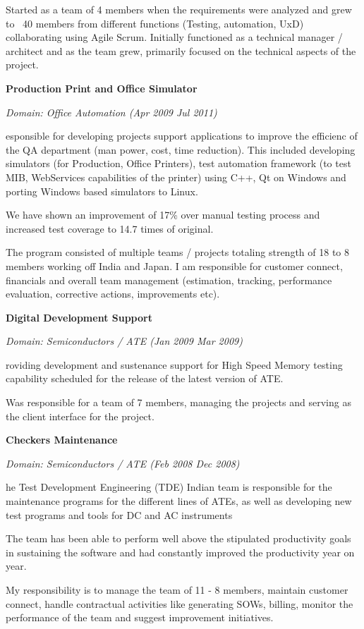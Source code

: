 \documentclass[a4paper,12pt]{article}
\newcommand\cvprojectentry[5]{
  \textbf{#1}
  
  \it{Domain: #2}\normalfont{} \quad (#3 \textendash #4)
  
}
\begin{document}
Started as a team of 4 members when the requirements were analyzed and
grew to ~40 members from different functions (Testing, automation,
UxD) collaborating using Agile Scrum. Initially functioned as a
technical manager / architect and as the team grew, primarily focused
on the technical aspects of the project.

\cvprojectentry{Production Print and Office Simulator}{Office Automation}{Apr 2009}{Jul 2011}
 
Responsible for developing projects support applications to improve
the efficienc of the QA department (man power, cost, time
reduction). This included developing simulators (for Production,
Office Printers), test automation framework (to test MIB, WebServices
capabilities of the printer) using C++, Qt on Windows and porting
Windows based simulators to Linux.
 
We have shown an improvement of 17\% over manual testing process and
increased test coverage to 14.7 times of original.
 
The program consisted of multiple teams / projects totaling strength
of 18 to 8 members working off India and Japan. I am responsible for
customer connect, financials and overall team management (estimation,
tracking, performance evaluation, corrective actions, improvements
etc).
 
\cvprojectentry{Digital Development Support}{Semiconductors / ATE}{Jan 2009}{Mar 2009}
 
Providing development and sustenance support for High Speed Memory
testing capability scheduled for the release of the latest version of
ATE.
 
Was responsible for a team of 7 members, managing the projects and
serving as the client interface for the project.
 
\cvprojectentry{Checkers Maintenance}{Semiconductors / ATE}{Feb 2008}{Dec 2008}

The Test Development Engineering (TDE) Indian team is responsible for
the maintenance programs for the different lines of ATEs, as well as
developing new test programs and tools for DC and AC instruments

The team has been able to perform well above the stipulated
productivity goals in sustaining the software and had constantly
improved the productivity year on year.
 
My responsibility is to manage the team of 11 - 8 members, maintain
customer connect, handle contractual activities like generating SOWs,
billing, monitor the performance of the team and suggest improvement
initiatives.
 
\end{document}
